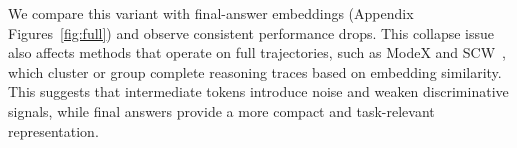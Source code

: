We compare this variant with final-answer embeddings (Appendix Figures~\ref{fig:full}) and observe consistent performance drops.
This collapse issue also affects methods that operate on full trajectories, such as ModeX and SCW~\citep{jain2023sc}, which cluster or group complete reasoning traces based on embedding similarity. 
This suggests that intermediate tokens introduce noise and weaken discriminative signals, while final answers provide a more compact and task-relevant representation. %







